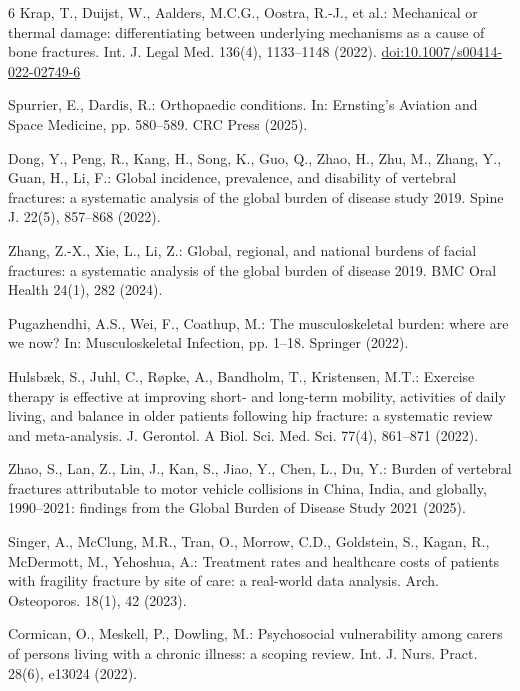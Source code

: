\documentclass{styles/svproc}
\begin{document}
\begin{thebibliography}{6}
 Krap, T., Duijst, W., Aalders, M.C.G., Oostra, R.-J., et al.: Mechanical or thermal damage: differentiating between underlying mechanisms as a cause of bone fractures. Int. J. Legal Med. 136(4), 1133--1148 (2022). \url{doi:10.1007/s00414-022-02749-6}

 Spurrier, E., Dardis, R.: Orthopaedic conditions. In: Ernsting's Aviation and Space Medicine, pp. 580--589. CRC Press (2025).

 Dong, Y., Peng, R., Kang, H., Song, K., Guo, Q., Zhao, H., Zhu, M., Zhang, Y., Guan, H., Li, F.: Global incidence, prevalence, and disability of vertebral fractures: a systematic analysis of the global burden of disease study 2019. Spine J. 22(5), 857--868 (2022).

 Zhang, Z.-X., Xie, L., Li, Z.: Global, regional, and national burdens of facial fractures: a systematic analysis of the global burden of disease 2019. BMC Oral Health 24(1), 282 (2024).

 Pugazhendhi, A.S., Wei, F., Coathup, M.: The musculoskeletal burden: where are we now? In: Musculoskeletal Infection, pp. 1--18. Springer (2022).

 Hulsb{\ae}k, S., Juhl, C., R{\o}pke, A., Bandholm, T., Kristensen, M.T.: Exercise therapy is effective at improving short- and long-term mobility, activities of daily living, and balance in older patients following hip fracture: a systematic review and meta-analysis. J. Gerontol. A Biol. Sci. Med. Sci. 77(4), 861--871 (2022).

 Zhao, S., Lan, Z., Lin, J., Kan, S., Jiao, Y., Chen, L., Du, Y.: Burden of vertebral fractures attributable to motor vehicle collisions in China, India, and globally, 1990--2021: findings from the Global Burden of Disease Study 2021 (2025).

 Singer, A., McClung, M.R., Tran, O., Morrow, C.D., Goldstein, S., Kagan, R., McDermott, M., Yehoshua, A.: Treatment rates and healthcare costs of patients with fragility fracture by site of care: a real-world data analysis. Arch. Osteoporos. 18(1), 42 (2023).

 Cormican, O., Meskell, P., Dowling, M.: Psychosocial vulnerability among carers of persons living with a chronic illness: a scoping review. Int. J. Nurs. Pract. 28(6), e13024 (2022).


\end{thebibliography}
\end{document}
